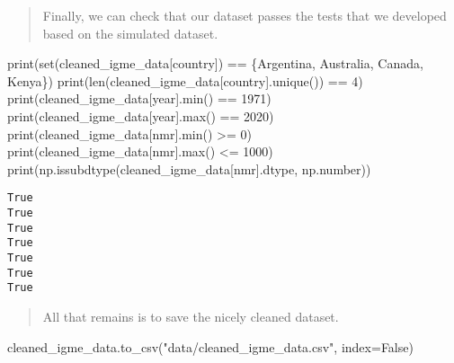 \documentclass[
  letterpaper,
  DIV=11,
  numbers=noendperiod]{scrreprt}
\newenvironment{Shaded}{\begin{snugshade}}{\end{snugshade}}
\newcommand{\BuiltInTok}[1]{\textcolor[rgb]{0.00,0.23,0.31}{#1}}
\newcommand{\DecValTok}[1]{\textcolor[rgb]{0.68,0.00,0.00}{#1}}
\newcommand{\NormalTok}[1]{\textcolor[rgb]{0.00,0.23,0.31}{#1}}
\newcommand{\OperatorTok}[1]{\textcolor[rgb]{0.37,0.37,0.37}{#1}}
\newcommand{\StringTok}[1]{\textcolor[rgb]{0.13,0.47,0.30}{#1}}
\newcommand{\VariableTok}[1]{\textcolor[rgb]{0.07,0.07,0.07}{#1}}
\begin{document}
\begin{quote}
Finally, we can check that our dataset passes the tests that we
developed based on the simulated dataset.
\end{quote}

\begin{Shaded}
\begin{Highlighting}[]
\BuiltInTok{print}\NormalTok{(}\BuiltInTok{set}\NormalTok{(cleaned\_igme\_data[}\StringTok{\textquotesingle{}country\textquotesingle{}}\NormalTok{]) }\OperatorTok{==}\NormalTok{ \{}\StringTok{\textquotesingle{}Argentina\textquotesingle{}}\NormalTok{, }\StringTok{\textquotesingle{}Australia\textquotesingle{}}\NormalTok{, }\StringTok{\textquotesingle{}Canada\textquotesingle{}}\NormalTok{, }\StringTok{\textquotesingle{}Kenya\textquotesingle{}}\NormalTok{\})}
\BuiltInTok{print}\NormalTok{(}\BuiltInTok{len}\NormalTok{(cleaned\_igme\_data[}\StringTok{\textquotesingle{}country\textquotesingle{}}\NormalTok{].unique()) }\OperatorTok{==} \DecValTok{4}\NormalTok{)}
\BuiltInTok{print}\NormalTok{(cleaned\_igme\_data[}\StringTok{\textquotesingle{}year\textquotesingle{}}\NormalTok{].}\BuiltInTok{min}\NormalTok{() }\OperatorTok{==} \DecValTok{1971}\NormalTok{)}
\BuiltInTok{print}\NormalTok{(cleaned\_igme\_data[}\StringTok{\textquotesingle{}year\textquotesingle{}}\NormalTok{].}\BuiltInTok{max}\NormalTok{() }\OperatorTok{==} \DecValTok{2020}\NormalTok{)}
\BuiltInTok{print}\NormalTok{(cleaned\_igme\_data[}\StringTok{\textquotesingle{}nmr\textquotesingle{}}\NormalTok{].}\BuiltInTok{min}\NormalTok{() }\OperatorTok{\textgreater{}=} \DecValTok{0}\NormalTok{)}
\BuiltInTok{print}\NormalTok{(cleaned\_igme\_data[}\StringTok{\textquotesingle{}nmr\textquotesingle{}}\NormalTok{].}\BuiltInTok{max}\NormalTok{() }\OperatorTok{\textless{}=} \DecValTok{1000}\NormalTok{)}
\BuiltInTok{print}\NormalTok{(np.issubdtype(cleaned\_igme\_data[}\StringTok{\textquotesingle{}nmr\textquotesingle{}}\NormalTok{].dtype, np.number))}
\end{Highlighting}
\end{Shaded}

\begin{verbatim}
True
True
True
True
True
True
True
\end{verbatim}

\begin{quote}
All that remains is to save the nicely cleaned dataset.
\end{quote}

\begin{Shaded}
\begin{Highlighting}[]
\NormalTok{cleaned\_igme\_data.to\_csv(}\StringTok{"data/cleaned\_igme\_data.csv"}\NormalTok{, index}\OperatorTok{=}\VariableTok{False}\NormalTok{)}
\end{Highlighting}
\end{Shaded}
\end{document}
